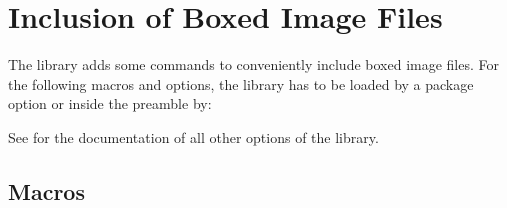 \clearpage
\section{Inclusion of Boxed Image Files}\label{sec:includegraphics}
The  library adds some commands to conveniently include
boxed image files.
For the following macros and options, the  library has to be loaded
by a package option or inside the preamble by:
\begin{dispListing}
\end{dispListing}

See  for the documentation of all other options of the  library.

\subsection{Macros}

